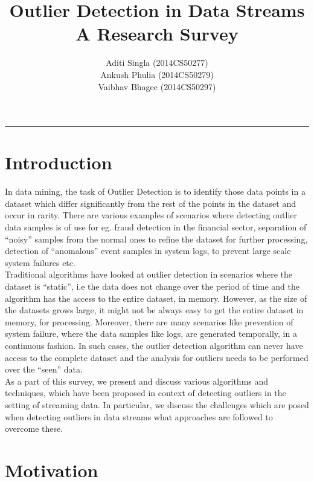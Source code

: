 \documentclass{article}
\title{\textbf{Outlier Detection in Data Streams \\ A Research Survey}}
\author{Aditi Singla (2014CS50277) \\ Ankush Phulia (2014CS50279) \\ Vaibhav Bhagee (2014CS50297)}
\begin{document}
\maketitle

\begin{center}
\noindent\rule{3.2cm}{0.4pt} 
\end{center}

    \section{Introduction}

    In data mining, the task of Outlier Detection is to identify those data points in a dataset which differ significantly from the rest of the points in the dataset and occur in rarity. There are various examples of scenarios where detecting outlier data samples is of use for eg. fraud detection in the financial sector, separation of ``noisy'' samples from the normal ones to refine the dataset for further processing, detection of ``anomalous'' event samples in system logs, to prevent large scale system failures etc. \\

    Traditional algorithms have looked at outlier detection in scenarios where the dataset is ``static'', i.e the data does not change over the period of time and the algorithm has the access to the entire dataset, in memory. However, as the size of the datasets grows large, it might not be always easy to get the entire dataset in memory, for processing. Moreover, there are many scenarios like prevention of system failure, where the data samples like logs, are generated temporally, in a continuous fashion. In such cases, the outlier detection algorithm can never have access to the complete dataset and the analysis for outliers needs to be performed over the ``seen'' data. \\

    As a part of this survey, we present and discuss various algorithms and techniques, which have been proposed in context of detecting outliers in the setting of streaming data. In particular, we discuss the challenges which are posed when detecting outliers in data streams what approaches are followed to overcome these.

    \section{Motivation}
\end{document}
